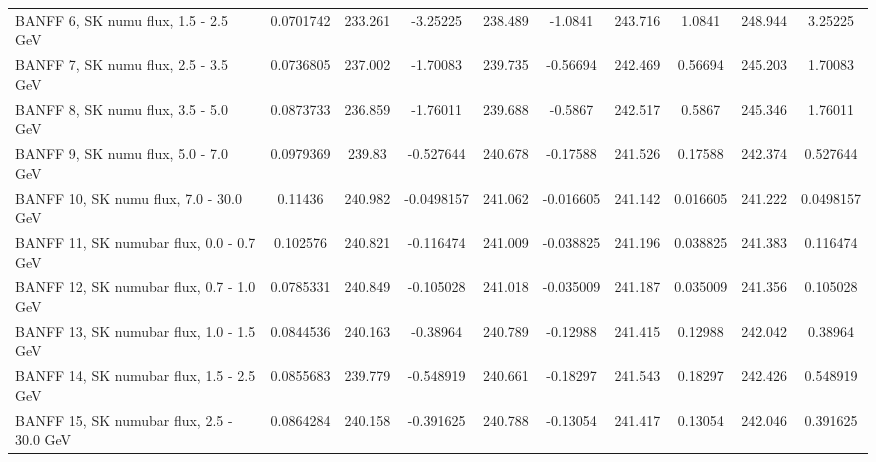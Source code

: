 \begin{tabular}{| l | S | S  S | S  S | S  S | S  S | }
                                           BANFF  6, SK numu flux, 1.5 - 2.5 GeV &       0.0701742 &         233.261 &        -3.25225 &         238.489 &         -1.0841 &         243.716 &          1.0841 &         248.944 &         3.25225 \\ 
                                           BANFF  7, SK numu flux, 2.5 - 3.5 GeV &       0.0736805 &         237.002 &        -1.70083 &         239.735 &        -0.56694 &         242.469 &         0.56694 &         245.203 &         1.70083 \\ 
                                           BANFF  8, SK numu flux, 3.5 - 5.0 GeV &       0.0873733 &         236.859 &        -1.76011 &         239.688 &         -0.5867 &         242.517 &          0.5867 &         245.346 &         1.76011 \\ 
                                           BANFF  9, SK numu flux, 5.0 - 7.0 GeV &       0.0979369 &          239.83 &       -0.527644 &         240.678 &        -0.17588 &         241.526 &         0.17588 &         242.374 &        0.527644 \\ 
                                          BANFF 10, SK numu flux, 7.0 - 30.0 GeV &         0.11436 &         240.982 &      -0.0498157 &         241.062 &       -0.016605 &         241.142 &        0.016605 &         241.222 &       0.0498157 \\ 
                                        BANFF 11, SK numubar flux, 0.0 - 0.7 GeV &        0.102576 &         240.821 &       -0.116474 &         241.009 &       -0.038825 &         241.196 &        0.038825 &         241.383 &        0.116474 \\ 
                                        BANFF 12, SK numubar flux, 0.7 - 1.0 GeV &       0.0785331 &         240.849 &       -0.105028 &         241.018 &       -0.035009 &         241.187 &        0.035009 &         241.356 &        0.105028 \\ 
                                        BANFF 13, SK numubar flux, 1.0 - 1.5 GeV &       0.0844536 &         240.163 &        -0.38964 &         240.789 &        -0.12988 &         241.415 &         0.12988 &         242.042 &         0.38964 \\ 
                                        BANFF 14, SK numubar flux, 1.5 - 2.5 GeV &       0.0855683 &         239.779 &       -0.548919 &         240.661 &        -0.18297 &         241.543 &         0.18297 &         242.426 &        0.548919 \\ 
                                       BANFF 15, SK numubar flux, 2.5 - 30.0 GeV &       0.0864284 &         240.158 &       -0.391625 &         240.788 &        -0.13054 &         241.417 &         0.13054 &         242.046 &        0.391625 \\ 

\end{tabular}
